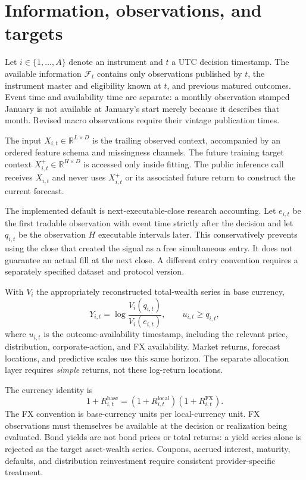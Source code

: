 \documentclass[11pt,a4paper]{article}
\newcommand{\R}{\mathbb R}
\newcommand{\F}{\mathcal F}
\begin{document}
\section{Information, observations, and targets}

Let $i\in\{1,\ldots,A\}$ denote an instrument and $t$ a UTC decision timestamp. The available information $\F_t$ contains only observations published by $t$, the instrument master and eligibility known at $t$, and previous matured outcomes. Event time and availability time are separate: a monthly observation stamped January is not available at January's start merely because it describes that month. Revised macro observations require their vintage publication times.

The input $X_{i,t}\in\R^{L\times D}$ is the trailing observed context, accompanied by an ordered feature schema and missingness channels. The future training target context $X^+_{i,t}\in\R^{H\times D}$ is accessed only inside fitting. The public inference call receives $X_{i,t}$ and never uses $X^+_{i,t}$ or its associated future return to construct the current forecast.

The implemented default is next-executable-close research accounting. Let $e_{i,t}$ be the first tradable observation with event time strictly after the decision and let $q_{i,t}$ be the observation $H$ executable intervals later. This conservatively prevents using the close that created the signal as a free simultaneous entry. It does not guarantee an actual fill at the next close. A different entry convention requires a separately specified dataset and protocol version.

With $V_i$ the appropriately reconstructed total-wealth series in base currency,
\begin{equation}
Y_{i,t}=\log\frac{V_i(q_{i,t})}{V_i(e_{i,t})},\qquad
u_{i,t}\ge q_{i,t},
\end{equation}
where $u_{i,t}$ is the outcome-availability timestamp, including the relevant price, distribution, corporate-action, and FX availability. Market returns, forecast locations, and predictive scales use this same horizon. The separate allocation layer requires \emph{simple} returns, not these log-return locations.

The currency identity is
\begin{equation}
1+R^{\mathrm{base}}_{i,t}=(1+R^{\mathrm{local}}_{i,t})(1+R^{\mathrm{FX}}_{i,t}).
\end{equation}
The FX convention is base-currency units per local-currency unit. FX observations must themselves be available at the decision or realization being evaluated. Bond yields are not bond prices or total returns: a yield series alone is rejected as the target asset-wealth series. Coupons, accrued interest, maturity, defaults, and distribution reinvestment require consistent provider-specific treatment.
\end{document}
